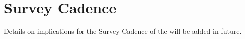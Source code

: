 \section{Survey Cadence}

Details on implications for the Survey Cadence of the \esp will be added in future. 

